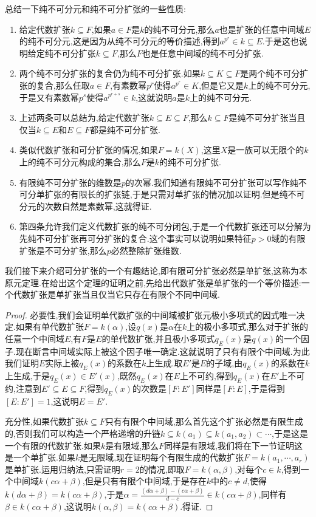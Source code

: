 总结一下纯不可分元和纯不可分扩张的一些性质:
\begin{enumerate}
	\item 给定代数扩张$k\subseteq F$,如果$a\in F$是$k$的纯不可分元,那么$a$也是扩张的任意中间域$E$的纯不可分元,这是因为从纯不可分元的等价描述,得到$a^{p^r}\in k\subseteq E$.于是这也说明给定纯不可分扩张$k\subseteq F$,那么$F$也是任意中间域的纯不可分扩张.
	\item 两个纯不可分扩张的复合仍为纯不可分扩张.如果$k\subseteq K\subseteq F$是两个纯不可分扩张的复合,那么任取$a\in F$,有素数幂$p^r$使得$a^{p^r}\in K$,但是它又是$k$上的纯不可分元,于是又有素数幂$p^s$使得$a^{p^{r+s}}\in k$,这就说明$a$是$k$上的纯不可分元.
	\item 上述两条可以总结为,给定代数扩张$k\subseteq E\subseteq F$,那么$k\subseteq F$是纯不可分扩张当且仅当$k\subseteq E$和$E\subseteq F$都是纯不可分扩张.
	\item 类似代数扩张和可分扩张的情况,如果$F=k(X)$,这里$X$是一族可以无限个的$k$上的纯不可分元构成的集合,那么$F$是$k$的纯不可分扩张.
	\item 有限纯不可分扩张的维数是$p$的次幂.我们知道有限纯不可分扩张可以写作纯不可分单扩张的有限长的扩张链,于是只需对单扩张的情况加以证明.但是纯不可分元的次数自然是素数幂,这就得证.
	\item 第四条允许我们定义代数扩张的纯不可分闭包,于是一个代数扩张还可以分解为先纯不可分扩张再可分扩张的复合.这个事实可以说明如果特征$p>0$域的有限扩张是不可分扩张,那么$p$必然整除扩张维数.
\end{enumerate}

我们接下来介绍可分扩张的一个有趣结论,即有限可分扩张必然是单扩张,这称为本原元定理.在给出这个定理的证明之前,先给出代数扩张是单扩张的一个等价描述:一个代数扩张是单扩张当且仅当它只存在有限个不同中间域.
\begin{proof}

必要性,我们会证明单代数扩张的中间域被扩张元极小多项式的因式唯一决定.如果有单代数扩张$F=k(\alpha)$,设$q(x)$是$\alpha$在$k$上的极小多项式,那么对于扩张的任意一个中间域$E$,有$F$是$E$的单代数扩张,并且极小多项式$q_E(x)$是$q(x)$的一个因子.现在断言中间域实际上被这个因子唯一确定.这就说明了只有有限个中间域.为此我们证明$E$实际上被$q_E(x)$的系数在$k$上生成.取$E'$是$E$的子域,由$q_E(x)$的系数在$k$上生成,于是$q_E(x)\in E'(x)$,既然$q_E(x)$在$E$上不可约,得到$q_E(x)$在$E'$上不可约,注意到$E'\subseteq E\subseteq F$,得到$q_E(x)$的次数是$[F:E']$同样是$[F:E]$,于是得到$[E:E']=1$,这说明$E=E'$.

充分性,如果代数扩张$k\subseteq F$只有有限个中间域,那么首先这个扩张必然是有限生成的,否则我们可以构造一个严格递增的升链$k\subseteq k(a_1)\subseteq k(a_1,a_2)\subset\cdots$,于是这是一个有限的代数扩张.如果$k$是有限域,那么$F$同样是有限域,我们将在下一节证明这是一个单扩张.如果$k$是无限域,现在证明每个有限生成的代数扩张$F=k(a_1,\cdots,a_r)$是单扩张.运用归纳法,只需证明$r=2$的情况,即取$F=k(\alpha,\beta)$,对每个$c\in k$,得到一个中间域$k(c\alpha+\beta)$,但是只有有限个中间域,于是存在$k$中的$c\not=d$,使得$k(d\alpha+\beta)=k(c\alpha+\beta)$,于是$\alpha=\frac{(d\alpha+\beta)-(c\alpha+\beta)}{d-c}\in k(c\alpha+\beta)$,同样有$\beta\in k(c\alpha+\beta)$,这说明$k(\alpha,\beta)=k(c\alpha+\beta)$.得证.
\end{proof}

